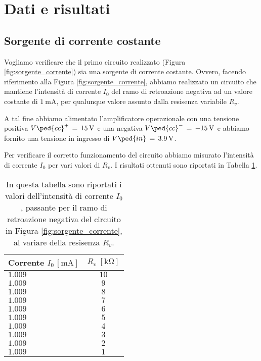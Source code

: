 \section*{Dati e risultati}

\subsection*{Sorgente di corrente costante}

Vogliamo verificare che il primo circuito realizzato (Figura \ref{fig:sorgente_corrente}) sia una sorgente di corrente costante. Ovvero, facendo riferimento alla Figura \ref{fig:sorgente_corrente}, abbiamo realizzato un circuito che mantiene l'intensità di corrente $I_0$ del ramo di retroazione negativa ad un valore costante di $\SI{1}{\milli\ampere}$, per qualunque valore assunto dalla resisenza variabile $R_v$.

A tal fine abbiamo alimentato l'amplificatore operazionale con una tensione positiva $V\ped{cc}^+\,=\,\SI{+15}{\volt}$ e una negativa $V\ped{cc}^-\,=\,\SI{-15}{\volt}$ e abbiamo fornito una tensione in ingresso di $V\ped{in}\,=\,\SI{+3.9}{\volt}$.

Per verificare il corretto funzionamento del circuito abbiamo misurato l'intensità di corrente $I_0$ per vari valori di $R_v$. I risultati ottenuti sono riportati in Tabella \ref{tab:corr_res}.


\begin{table}[H]
    \centering
    \small
    \begin{tabular}{l c}
        \toprule
		Corrente $I_0 \, [\si{\milli\ampere}]$ & $R_v \; [\si{\kilo\ohm}]$ \\
        \midrule
		$ 1.009 $ & $ 10 $ \\
		$ 1.009 $ & $ 9 $ \\
		$ 1.009 $ & $ 8 $ \\
		$ 1.009 $ & $ 7 $ \\
		$ 1.009 $ & $ 6 $ \\
		$ 1.009 $ & $ 5 $ \\
		$ 1.009 $ & $ 4 $ \\
		$ 1.009 $ & $ 3 $ \\
		$ 1.009 $ & $ 2 $ \\
		$ 1.009 $ & $ 1 $ \\
        \bottomrule
    \end{tabular}
    \caption{In questa tabella sono riportati i valori dell'intensità di corrente $I_0$, passante per il ramo di retroazione negativa del circuito in Figura \ref{fig:sorgente_corrente}, al variare della resisenza $R_v$. }
    \label{tab:corr_res}
\end{table}

